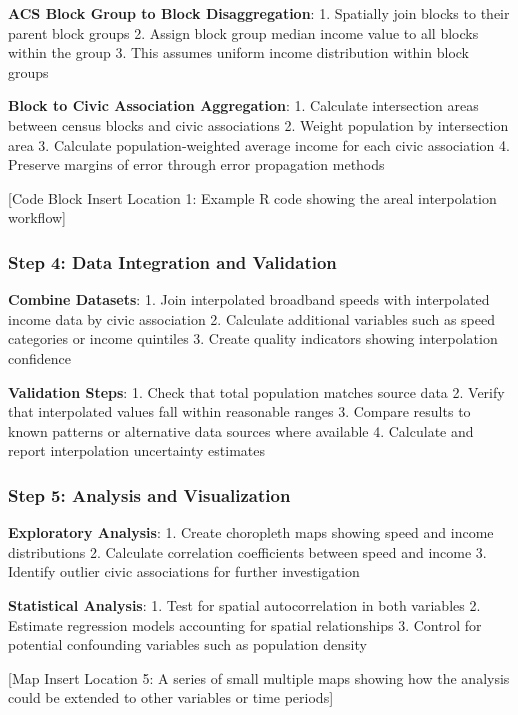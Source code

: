 \documentclass[
  letterpaper,
  DIV=11,
  numbers=noendperiod]{scrartcl}
\begin{document}
\textbf{ACS Block Group to Block Disaggregation}: 1. Spatially join
blocks to their parent block groups 2. Assign block group median income
value to all blocks within the group 3. This assumes uniform income
distribution within block groups

\textbf{Block to Civic Association Aggregation}: 1. Calculate
intersection areas between census blocks and civic associations 2.
Weight population by intersection area 3. Calculate population-weighted
average income for each civic association 4. Preserve margins of error
through error propagation methods

{[}Code Block Insert Location 1: Example R code showing the areal
interpolation workflow{]}

\subsubsection{Step 4: Data Integration and
Validation}\label{step-4-data-integration-and-validation}

\textbf{Combine Datasets}: 1. Join interpolated broadband speeds with
interpolated income data by civic association 2. Calculate additional
variables such as speed categories or income quintiles 3. Create quality
indicators showing interpolation confidence

\textbf{Validation Steps}: 1. Check that total population matches source
data 2. Verify that interpolated values fall within reasonable ranges 3.
Compare results to known patterns or alternative data sources where
available 4. Calculate and report interpolation uncertainty estimates

\subsubsection{Step 5: Analysis and
Visualization}\label{step-5-analysis-and-visualization}

\textbf{Exploratory Analysis}: 1. Create choropleth maps showing speed
and income distributions 2. Calculate correlation coefficients between
speed and income 3. Identify outlier civic associations for further
investigation

\textbf{Statistical Analysis}: 1. Test for spatial autocorrelation in
both variables 2. Estimate regression models accounting for spatial
relationships 3. Control for potential confounding variables such as
population density

{[}Map Insert Location 5: A series of small multiple maps showing how
the analysis could be extended to other variables or time periods{]}
\end{document}
